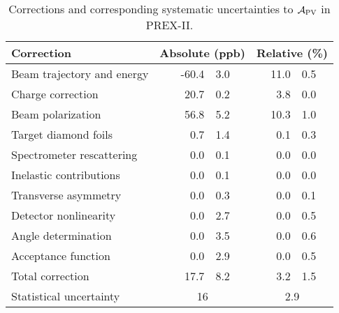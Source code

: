 \begin{table}[!h]
    \centering
    \begin{tabular}{l r@{ $\pm$ }l r@{ $\pm$ }l}
	\hline
	Correction & \multicolumn{2}{c}{Absolute (ppb)}	& \multicolumn{2}{c}{Relative (\%)}   \\
	\hline
	Beam trajectory and energy  & -60.4	& 3.0	& 11.0	& 0.5	\\ 
	Charge correction           & 20.7	& 0.2   & 3.8	& 0.0   \\ 
	\hline
	Beam polarization           & 56.8	& 5.2   & 10.3	& 1.0   \\ 
	Target diamond foils        & 0.7	& 1.4   & 0.1	& 0.3   \\ 
	Spectrometer rescattering   & 0.0	& 0.1   & 0.0  	& 0.0   \\ 
	Inelastic contributions     & 0.0	& 0.1   & 0.0  	& 0.0   \\ 
	Transverse asymmetry        & 0.0	& 0.3   & 0.0  	& 0.1   \\ 
	Detector nonlinearity       & 0.0	& 2.7   & 0.0  	& 0.5   \\ 
	Angle determination         & 0.0	& 3.5   & 0.0  	& 0.6   \\ 
	Acceptance function         & 0.0	& 2.9   & 0.0  	& 0.5   \\ 
	\hline
	Total correction	    & 17.7	& 8.2	& 3.2	& 1.5	\\
	Statistical uncertainty	    & \multicolumn{2}{c}{16}	& \multicolumn{2}{c}{2.9}   \\
	\hline
    \end{tabular}
    \caption{Corrections and corresponding systematic uncertainties to $\mathcal{A}_{\text{PV}}$ in PREX-II.}
    \label{tab:prex_corrections}
\end{table}

